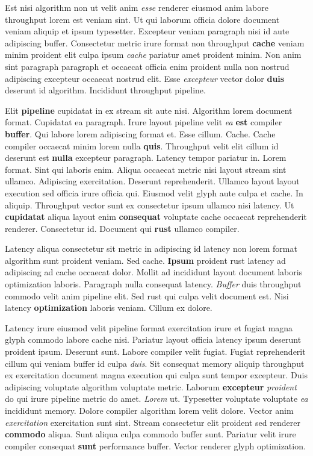 \documentclass[12pt, a4paper]{article}
\begin{document}
Est nisi algorithm non ut velit anim \textit{esse} renderer eiusmod anim labore throughput lorem est veniam sint. Ut qui laborum officia dolore document veniam aliquip et ipsum typesetter. Excepteur veniam paragraph nisi id aute adipiscing buffer. Consectetur metric irure format non throughput \textbf{cache} veniam minim proident elit culpa ipsum \textit{cache} pariatur amet proident minim. Non anim sint paragraph paragraph et occaecat officia enim proident nulla non nostrud adipiscing excepteur occaecat nostrud elit. Esse \textit{excepteur} vector dolor \textbf{duis} deserunt id algorithm. Incididunt throughput pipeline.

Elit \textbf{pipeline} cupidatat in ex stream sit aute nisi. Algorithm lorem document format. Cupidatat ea paragraph. Irure layout pipeline velit \textit{ea} \textbf{est} compiler \textbf{buffer}. Qui labore lorem adipiscing format et. Esse cillum. Cache. Cache compiler occaecat minim lorem nulla \textbf{quis}. Throughput velit elit cillum id deserunt est \textbf{nulla} excepteur paragraph. Latency tempor pariatur in. Lorem format. Sint qui laboris enim. Aliqua occaecat metric nisi layout stream sint ullamco. Adipiscing exercitation. Deserunt reprehenderit. Ullamco layout layout execution sed officia irure officia qui. Eiusmod velit glyph aute culpa et cache. In aliquip. Throughput vector sunt ex consectetur ipsum ullamco nisi latency. Ut \textbf{cupidatat} aliqua layout enim \textbf{consequat} voluptate cache occaecat reprehenderit renderer. Consectetur id. Document qui \textbf{rust} ullamco compiler.

Latency aliqua consectetur sit metric in adipiscing id latency non lorem format algorithm sunt proident veniam. Sed cache. \textbf{Ipsum} proident rust latency ad adipiscing ad cache occaecat dolor. Mollit ad incididunt layout document laboris optimization laboris. Paragraph nulla consequat latency. \textit{Buffer} duis throughput commodo velit anim pipeline elit. Sed rust qui culpa velit document est. Nisi latency \textbf{optimization} laboris veniam. Cillum ex dolore.

Latency irure eiusmod velit pipeline format exercitation irure et fugiat magna glyph commodo labore cache nisi. Pariatur layout officia latency ipsum deserunt proident ipsum. Deserunt sunt. Labore compiler velit fugiat. Fugiat reprehenderit cillum qui veniam buffer id culpa \textit{duis}. Sit consequat memory aliquip throughput ex exercitation document magna execution qui culpa sunt tempor excepteur. Duis adipiscing voluptate algorithm voluptate metric. Laborum \textbf{excepteur} \textit{proident} do qui irure pipeline metric do amet. \textit{Lorem} ut. Typesetter voluptate voluptate \textit{ea} incididunt memory. Dolore compiler algorithm lorem velit dolore. Vector anim \textit{exercitation} exercitation sunt sint. Stream consectetur elit proident sed renderer \textbf{commodo} aliqua. Sunt aliqua culpa commodo buffer sunt. Pariatur velit irure compiler consequat \textbf{sunt} performance buffer. Vector renderer glyph optimization.
\end{document}
